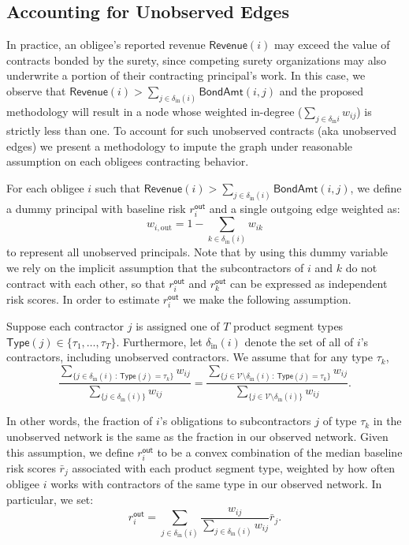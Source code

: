 \documentclass[mnsc,nonblindrev]{informs3}
\newcommand{\din}{\delta_{\text{in}}}
\newcommand{\rout}[1]{r_{#1}^{\textsf{out}}}
\newcommand{\revenue}{\textsf{Revenue}}
\newcommand{\bond}{\textsf{BondAmt}}
\newcommand{\ctype}{\textsf{Type}}
\newcommand{\out}{\text{out}}
\begin{document}
\begin{APPENDICES}
\subsection{Accounting for Unobserved Edges}
\label{app:simulations_unobserved_edges}

In practice, an obligee's reported revenue $\revenue(i)$ may exceed the value of contracts bonded by the surety, since competing surety organizations may also underwrite a portion of their contracting principal's work.  In this case, we observe that $\revenue(i) > \sum_{j \in \din(i)} \bond(i,j)$ and the proposed methodology will result in a node whose weighted in-degree ($\sum_{j \in \din{i}} w_{ij}$) is strictly less than one.  To account for such unobserved contracts (aka unobserved edges) we present a methodology to impute the graph under reasonable assumption on each obligees contracting behavior.

For each obligee $i$ such that $\revenue(i) > \sum_{j \in \din(i)} \bond(i,j)$, we define a dummy principal with baseline risk $\rout{i}$ and a single outgoing edge weighted as:
\[w_{i,\out} = 1 - \sum_{k\in\din(i)} w_{ik}
\]
to represent all unobserved principals.  Note that by using this dummy variable we rely on the implicit assumption that the subcontractors of $i$ and $k$ do not contract with each other, so that $\rout{i}$ and $\rout{k}$ can be expressed as independent risk scores.
In order to estimate $\rout{i}$ we make the following assumption.

\begin{assumption}
    Suppose each contractor $j$ is assigned one of $T$ product segment types $\ctype(j) \in \{\tau_1,\dots,\tau_T\}$.
    Furthermore, let $\din(i)$ denote the set of all of $i$'s contractors, including unobserved contractors.
    We assume that for any type $\tau_k$,
    \begin{equation*}
        \frac{ \sum_{\{j\in\din(i)\,:\,\ctype(j)=\tau_k\}} w_{ij} }
        { \sum_{\{j\in\din(i)\}} w_{ij} }
        = 
        \frac{ \sum_{\{j\in\mathcal{V}\setminus\din(i)\,:\,\ctype(j)=\tau_k\}} w_{ij} }
        { \sum_{\{j\in\mathcal{V}\setminus\din(i)\}} w_{ij} }.
    \end{equation*}
\end{assumption}
In other words, the fraction of $i$'s obligations to subcontractors  $j$ of type $\tau_k$ in the unobserved network is the same as the fraction in our observed network.
Given this assumption, we define $\rout{i}$ to be a convex combination of the median baseline risk scores $\bar{r}_j$ associated with each product segment type, weighted by how often obligee $i$ works with contractors of the same type in our observed network.  In particular, we set:
\begin{equation*}
    \rout{i} = \sum_{j\in\din(i)} \frac{w_{ij}}{\sum_{j\in\din(i)} w_{ij}} \bar{r}_j.
\end{equation*}





\end{APPENDICES}
\end{document}
